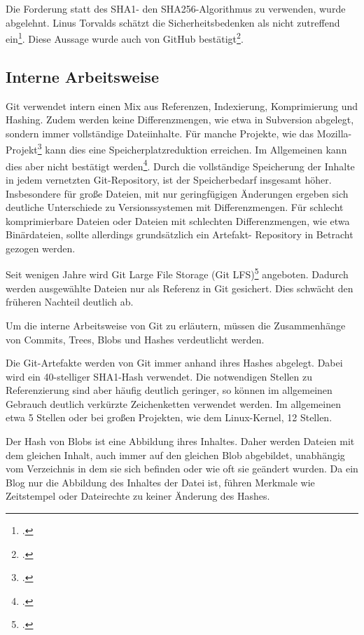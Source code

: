 Die Forderung statt des SHA1- den SHA256-Algorithmus zu verwenden, wurde abgelehnt. Linus Torvalds schätzt die Sicherheitsbedenken als nicht zutreffend ein\footcite[vgl.][]{git-sha-torvalds}. Diese 
Aussage wurde auch von GitHub bestätigt\footcite[vgl.][]{git-sha-github}.

\subsection{Interne Arbeitsweise}

Git verwendet intern einen Mix aus Referenzen, Indexierung, Komprimierung und Hashing. Zudem werden keine 
Differenzmengen, wie etwa in Subversion abgelegt, sondern immer vollständige Dateiinhalte. Für manche Projekte, wie das 
Mozilla-Projekt\footcite[vgl.][]{kernel-git-svn} kann dies eine Speicherplatzreduktion erreichen. Im Allgemeinen kann dies aber nicht bestätigt werden\footcite[vgl.][]{svn-vs-git}. Durch die vollständige Speicherung der Inhalte in jedem vernetzten Git-Repository, ist der Speicherbedarf insgesamt höher. Insbesondere für große Dateien, mit nur geringfügigen Änderungen ergeben sich deutliche Unterschiede zu Versionssystemen mit Differenzmengen. Für schlecht komprimierbare Dateien oder Dateien mit schlechten Differenzmengen, wie etwa Binärdateien, sollte allerdings grundsätzlich ein Artefakt-
Repository in Betracht gezogen werden. 

Seit wenigen Jahre wird \glqq Git Large File Storage\grqq{} (Git LFS)\footcite{git-lfs} angeboten. Dadurch werden ausgewählte Dateien nur als Referenz in Git gesichert. Dies schwächt den früheren Nachteil deutlich ab.

Um die interne Arbeitsweise von Git zu erläutern, müssen die Zusammenhänge von Commits, Trees, Blobs und Hashes 
verdeutlicht werden.

Die Git-Artefakte werden von Git immer anhand ihres Hashes abgelegt. Dabei wird ein 40-stelliger SHA1-Hash verwendet. Die 
notwendigen Stellen zu Referenzierung sind aber häufig deutlich geringer, so können im allgemeinen Gebrauch deutlich 
verkürzte Zeichenketten verwendet werden. Im allgemeinen etwa 5 Stellen oder bei großen Projekten, wie dem Linux-Kernel, 
12 Stellen.

Der Hash von Blobs ist eine Abbildung ihres Inhaltes. Daher werden Dateien mit dem gleichen Inhalt, auch immer auf den 
gleichen Blob abgebildet, unabhängig vom Verzeichnis in dem sie sich befinden oder wie oft sie geändert wurden. Da ein 
Blog nur die Abbildung des Inhaltes der Datei ist, führen Merkmale wie Zeitstempel oder Dateirechte zu keiner Änderung 
des Hashes.

